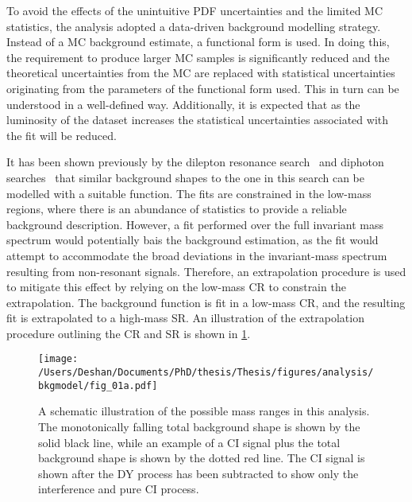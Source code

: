 To avoid the effects of the unintuitive PDF uncertainties and the limited MC statistics, the analysis adopted a data-driven background modelling strategy. Instead of a MC background estimate, a functional form is used. In doing this, the requirement to produce larger MC samples is significantly reduced and the theoretical uncertainties from the MC are replaced with statistical uncertainties originating from the parameters of the functional form used. This in turn can be understood in a well-defined way. Additionally, it is expected that as the luminosity of the dataset increases the statistical uncertainties associated with the fit will be reduced. 

It has been shown previously by the dilepton resonance search~\cite{Aad:2019fac} and diphoton searches~\cite{Aaboud:2016tru,Aaboud:2017yyg} that similar background shapes to the one in this search can be modelled with a suitable function. The fits are constrained in the low-mass regions, where there is an abundance of statistics to provide a reliable background description. However, a fit performed over the full invariant mass spectrum would potentially bais the background estimation, as the fit would attempt to accommodate the broad deviations in the invariant-mass spectrum resulting from non-resonant signals. Therefore, an extrapolation procedure is used to mitigate this effect by relying on the low-mass CR to constrain the extrapolation. The background function is fit in a low-mass CR, and the resulting fit is extrapolated to a high-mass SR. An illustration of the extrapolation procedure outlining the CR and SR is shown in \cref{fig:bkgmodel:ranges}.

\begin{figure}[!htpb]
    \centering
    \texttt{[image: /Users/Deshan/Documents/PhD/thesis/Thesis/figures/analysis/bkgmodel/fig\_01a.pdf]} 
    \caption[A schematic illustration of the possible mass ranges in this analysis.]{A schematic illustration of the possible mass ranges in this analysis.
    The monotonically falling total background shape is shown by the solid black line, while an example of a CI signal plus the total background shape is shown by the dotted red line. The CI signal is shown after the DY process has been subtracted to show only the interference and pure CI process.}
    \label{fig:bkgmodel:ranges}
\end{figure}

